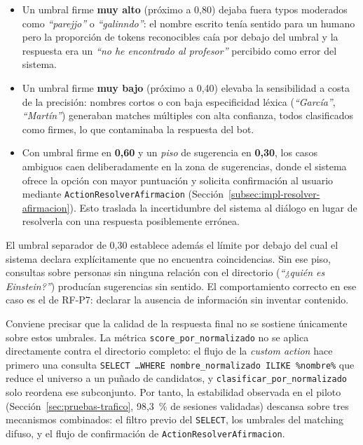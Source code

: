 \begin{itemize}
    \item Un umbral firme \textbf{muy alto} (próximo a 0,80) dejaba fuera typos moderados como \textit{``parejjo''} o \textit{``galinndo''}: el nombre escrito tenía sentido para un humano pero la proporción de tokens reconocibles caía por debajo del umbral y la respuesta era un \textit{``no he encontrado al profesor''} percibido como error del sistema.
    \item Un umbral firme \textbf{muy bajo} (próximo a 0,40) elevaba la sensibilidad a costa de la precisión: nombres cortos o con baja especificidad léxica (\textit{``García''}, \textit{``Martín''}) generaban matches múltiples con alta confianza, todos clasificados como firmes, lo que contaminaba la respuesta del bot.
    \item Con umbral firme en \textbf{0,60} y un \textit{piso} de sugerencia en \textbf{0,30}, los casos ambiguos caen deliberadamente en la zona de sugerencias, donde el sistema ofrece la opción con mayor puntuación y solicita confirmación al usuario mediante \texttt{ActionResolverAfirmacion} (Sección~\ref{subsec:impl-resolver-afirmacion}). Esto traslada la incertidumbre del sistema al diálogo en lugar de resolverla con una respuesta posiblemente errónea.
\end{itemize}

El umbral separador de 0,30 establece además el límite por debajo del cual el sistema declara explícitamente que no encuentra coincidencias. Sin ese piso, consultas sobre personas sin ninguna relación con el directorio (\textit{``¿quién es Einstein?''}) producían sugerencias sin sentido. El comportamiento correcto en ese caso es el de RF-P7: declarar la ausencia de información sin inventar contenido.

Conviene precisar que la calidad de la respuesta final no se sostiene únicamente sobre estos umbrales. La métrica \texttt{score\_por\_normalizado} no se aplica directamente contra el directorio completo: el flujo de la \textit{custom action} hace primero una consulta \texttt{SELECT \ldots WHERE nombre\_normalizado ILIKE \%nombre\%} que reduce el universo a un puñado de candidatos, y \texttt{clasificar\_por\_normalizado} solo reordena ese subconjunto. Por tanto, la estabilidad observada en el piloto (Sección~\ref{sec:pruebas-trafico}, 98,3~\% de sesiones validadas) descansa sobre tres mecanismos combinados: el filtro previo del \texttt{SELECT}, los umbrales del matching difuso, y el flujo de confirmación de \texttt{ActionResolverAfirmacion}.

